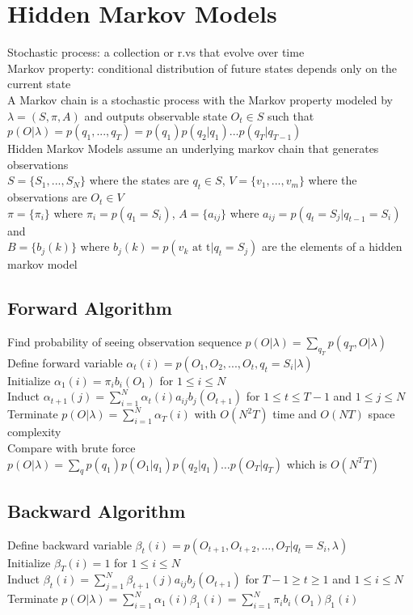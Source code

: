 \documentclass{article}
\renewcommand{\P}{p}
\begin{document}
\section{Hidden Markov Models}
Stochastic process: a collection or r.vs that evolve over time \\
Markov property: conditional distribution of future states depends only on the current state \\
A Markov chain is a stochastic process with the Markov property modeled by $\lambda = (S, \pi, A)$ and outputs observable state $O_t \in S$ such that $\P(O | \lambda) = \P(q_1, ..., q_T) = \P(q_1)\P(q_2 | q_1)...\P(q_T | q_{T-1})$ \\
Hidden Markov Models assume an underlying markov chain that generates observations   \\
$S = \{S_1, ..., S_N\}$ where the states are $q_t \in S$, $V = \{v_1, ..., v_m\}$ where the observations are $O_t \in V$ \\
$\pi = \{\pi_i\}$ where $\pi_i = \P(q_1 = S_i)$, $A = \{a_{ij}\}$ where $a_{ij} = \P(q_t = S_j | q_{t-1} = S_i)$ and \\
$B = \{b_j(k)\}$ where $b_j(k) = \P(v_k \mbox{ at t} | q_t = S_j)$ are the elements of a hidden markov model

\subsection{Forward Algorithm}
Find probability of seeing observation sequence $p(O|\lambda) = \sum_{q_T} p(q_T, O | \lambda)$  \\
Define forward variable $\alpha_t(i) = \P(O_1, O_2, ..., O_t, q_t = S_i | \lambda)$ \\
Initialize $\alpha_1(i) = \pi_i b_i(O_1)$ for $1 \leq i \leq N$ \\
Induct $\alpha_{t+1}(j) = \sum_{i=1}^N \alpha_t(i)a_{ij} b_j(O_{t+1})$ for $1 \leq t \leq T -1$ and $1 \leq j \leq N$ \\
Terminate $\P(O | \lambda) = \sum_{i=1}^N \alpha_T(i)$ with $O(N^2T)$ time and $O(NT)$ space complexity \\
Compare with brute force $p(O|\lambda) =\sum_q p(q_1)p(O_1|q_1)p(q_2|q_1) \ldots p(O_T|q_T)$ which is $O(N^TT)$

\subsection{Backward Algorithm}
Define backward variable $\beta_t(i) = \P(O_{t+1}, O_{t+2}, ..., O_T | q_t = S_i, \lambda)$ \\
Initialize $\beta_T(i) = 1$ for $1 \leq i \leq N$ \\
Induct $\beta_{t}(i) = \sum_{j=1}^N \beta_{t+1}(j) a_{ij} b_j(O_{t+1})$ for $T-1 \geq t \geq 1$ and $1 \leq i \leq N$ \\
Terminate $p(O | \lambda) = \sum_{i=1}^N \alpha_1(i)\beta_1(i) = \sum_{i=1}^N  \pi_i b_i(O_1) \beta_1(i)$
\end{document}
